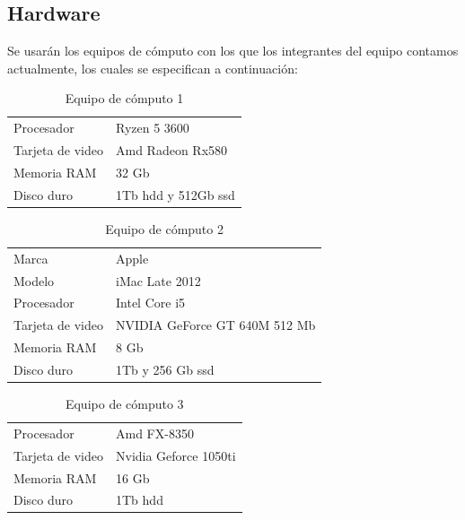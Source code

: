 \documentclass[12pt, a4paper, titlepage]{report}
\begin{document}
	   	\subsection{Hardware}
	   	Se usarán los equipos de cómputo con los que los integrantes del equipo contamos actualmente, los cuales se especifican a continuación: 
	   	\begin{table}[H]
	   		\begin{tabular}{|p{3.5cm}||p{10cm}|}
	   			\rowcolor{guindapoli}
	   			\multicolumn{2}{|c|}{\textbf{\textcolor{white}{Equipo de cómputo utilizado. [1]}}}\\
	   			\hline
	   			\rowcolor{azulclaro}Procesador & Ryzen 5 3600\\
	   			\hline
	   			\rowcolor{white}Tarjeta de video & Amd Radeon Rx580\\
	   			\hline
	   			\rowcolor{azulclaro}Memoria RAM & 32 Gb\\
	   			\hline
	   			\rowcolor{white}Disco duro & 1Tb \acrshort{hdd} y 512Gb \acrshort{ssd}\\
	   			\hline
	   		\end{tabular}
	   		\caption[Equipo de cómputo 1]{Equipo de cómputo 1}
	   	\end{table}
	   	\begin{table}[H]
	   		\begin{tabular}{|p{3.5cm}||p{10cm}|}
	   			\rowcolor{guindapoli}
	   			\multicolumn{2}{|c|}{\textbf{\textcolor{white}{Equipo de cómputo utilizado. [2]}}}\\
	   			\hline
	   			\rowcolor{azulclaro}Marca & Apple\\
	   			\hline
	   			\rowcolor{white}Modelo & iMac Late 2012\\
	   			\hline
	   			\rowcolor{azulclaro}Procesador & Intel Core i5\\
	   			\hline
	   			\rowcolor{white}Tarjeta de video & NVIDIA GeForce GT 640M 512 Mb\\
	   			\hline
	   			\rowcolor{azulclaro}Memoria RAM & 8 Gb\\
	   			\hline
	   			\rowcolor{white}Disco duro & 1Tb y 256 Gb \acrshort{ssd}\\
	   			\hline
	   		\end{tabular}
	   		\caption[Equipo de cómputo 2]{Equipo de cómputo 2}
	   	\end{table}
	   	\begin{table}[H]
	   		\begin{tabular}{|p{3.5cm}||p{10cm}|}
	   			\rowcolor{guindapoli}
	   			\multicolumn{2}{|c|}{\textbf{\textcolor{white}{Equipo de cómputo utilizado. [3]}}}\\
	   			\hline
	   			\rowcolor{azulclaro}Procesador & Amd FX-8350\\
	   			\hline
	   			\rowcolor{white}Tarjeta de video & Nvidia Geforce 1050ti\\
	   			\hline
	   			\rowcolor{azulclaro}Memoria RAM & 16 Gb\\
	   			\hline
	   			\rowcolor{white}Disco duro & 1Tb \acrshort{hdd}\\
	   			\hline
	   		\end{tabular}
	   		\caption[Equipo de cómputo 3]{Equipo de cómputo 3}
	   	\end{table}
\end{document}
